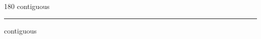 
\begin{frame}
\begin{center}
\begin{turn}{180}
{\fontsize{2.5cm}{1em}\selectfont contiguous}
\end{turn}
\vspace{1em}\par  
\hrule
\vspace{1em}\par  
{\fontsize{2.5cm}{1em}\selectfont contiguous}
\end{center}
\end{frame}
